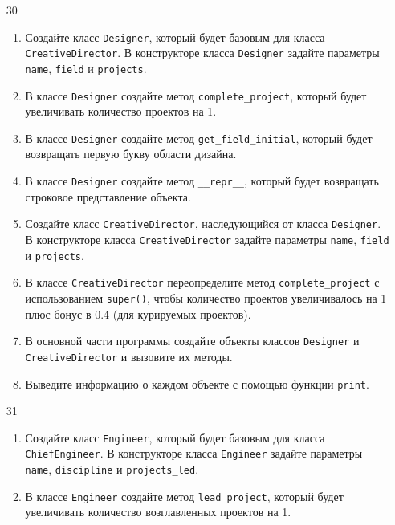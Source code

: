 \begin{enumerate}
\item[30] 
\begin{enumerate}[leftmargin=*]
    \item Создайте класс \texttt{Designer}, который будет базовым для класса \texttt{CreativeDirector}. В конструкторе класса \texttt{Designer} задайте параметры \texttt{name}, \texttt{field} и \texttt{projects}.
    
    \item В классе \texttt{Designer} создайте метод \texttt{complete\_project}, который будет увеличивать количество проектов на 1.
    
    \item В классе \texttt{Designer} создайте метод \texttt{get\_field\_initial}, который будет возвращать первую букву области дизайна.
    
    \item В классе \texttt{Designer} создайте метод \texttt{\_\_repr\_\_}, который будет возвращать строковое представление объекта.
    
    \item Создайте класс \texttt{CreativeDirector}, наследующийся от класса \texttt{Designer}. В конструкторе класса \texttt{CreativeDirector} задайте параметры \texttt{name}, \texttt{field} и \texttt{projects}.
    
    \item В классе \texttt{CreativeDirector} переопределите метод \texttt{complete\_project} с использованием \texttt{super()}, чтобы количество проектов увеличивалось на 1 плюс бонус в 0.4 (для курируемых проектов).
    
    \item В основной части программы создайте объекты классов \texttt{Designer} и \texttt{CreativeDirector} и вызовите их методы.
    
    \item Выведите информацию о каждом объекте с помощью функции \texttt{print}.
\end{enumerate}

\item[31] 
\begin{enumerate}[leftmargin=*]
    \item Создайте класс \texttt{Engineer}, который будет базовым для класса \texttt{ChiefEngineer}. В конструкторе класса \texttt{Engineer} задайте параметры \texttt{name}, \texttt{discipline} и \texttt{projects\_led}.
    
    \item В классе \texttt{Engineer} создайте метод \texttt{lead\_project}, который будет увеличивать количество возглавленных проектов на 1.
    

\end{enumerate}
\end{enumerate}
